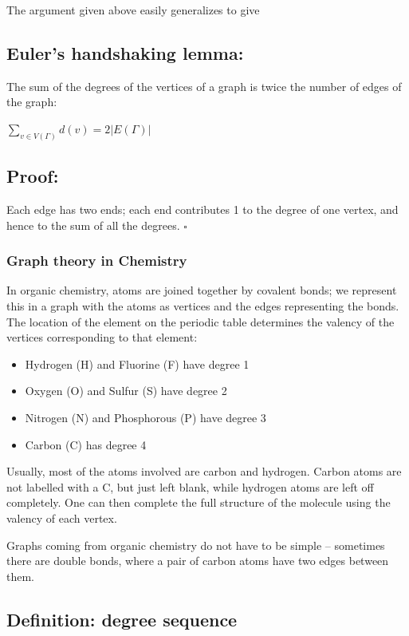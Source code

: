 \documentclass[]{article}
\providecommand{\tightlist}{%
  \setlength{\itemsep}{0pt}\setlength{\parskip}{0pt}}
\begin{document}
The argument given above easily generalizes to give

\subsection{Euler's handshaking lemma:}\label{eulers-handshaking-lemma}

The sum of the degrees of the vertices of a graph is twice the number of
edges of the graph:

\(\sum_{v\in V(\Gamma)}d(v)=2|E(\Gamma)|\)

\subsection{Proof:}\label{proof}

Each edge has two ends; each end contributes 1 to the degree of one
vertex, and hence to the sum of all the degrees. \(\square\)

\subsubsection{Graph theory in Chemistry}\label{graph-theory-in-chemistry}

In organic chemistry, atoms are joined together by covalent bonds; we
represent this in a graph with the atoms as vertices and the edges
representing the bonds. The location of the element on the periodic
table determines the valency of the vertices corresponding to that
element:

\begin{itemize}
\tightlist
\item
  Hydrogen (H) and Fluorine (F) have degree 1
\item
  Oxygen (O) and Sulfur (S) have degree 2
\item
  Nitrogen (N) and Phosphorous (P) have degree 3
\item
  Carbon (C) has degree 4
\end{itemize}

Usually, most of the atoms involved are carbon and hydrogen. Carbon
atoms are not labelled with a C, but just left blank, while hydrogen
atoms are left off completely. One can then complete the full structure
of the molecule using the valency of each vertex.

Graphs coming from organic chemistry do not have to be simple --
sometimes there are double bonds, where a pair of carbon atoms have two
edges between them.

\subsection{Definition: degree sequence}\label{definition-degree-sequence}
\end{document}
